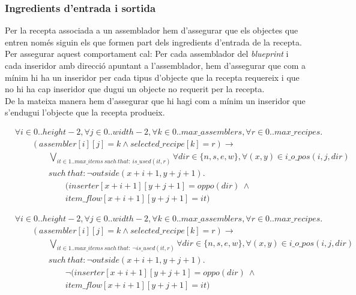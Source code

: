 \subsubsection{Ingredients d'entrada i sortida}
Per la recepta associada a un assemblador hem d'assegurar que els objectes que entren només siguin els que formen part dels ingredients d'entrada de la recepta. Per assegurar aquest comportament cal:
Per cada assemblador del \textit{blueprint} i cada inseridor amb direcció apuntant a l'assemblador, hem d'assegurar que com a mínim hi ha un inseridor per cada tipus d'objecte que la recepta requereix i que no hi ha cap inseridor que dugui un objecte no requerit per la recepta.\\
De la mateixa manera hem d'assegurar que hi hagi com a mínim un inseridor que s'endugui l'objecte que la recepta produeix.

\begin{align*}
    &\forall i \in 0..height-2, \forall j \in 0..width-2, \forall k \in 0..max\_assemblers, \forall r \in 0..max\_recipes.\\
    &\qquad (assembler[i][j]=k \land selected\_recipe[k]=r)\rightarrow\\
    &\qquad \qquad \bigvee_{it \in 1..max\_items \ such \ that: \ is\_used(it, r)} \forall dir\in\{n,s,e,w\},\forall (x,y)\in i\_o\_pos(i,j,dir)\\
    &\qquad \qquad such \ that: \lnot outside(x+i+1, y+j+1).\\
    &\qquad \qquad \qquad (inserter[x+i+1][y+j+1]=oppo(dir) \ \land\\
    &\qquad \qquad \qquad item\_flow[x+i+1][y+j+1]=it)
\end{align*}

\begin{align*}
    &\forall i \in 0..height-2, \forall j \in 0..width-2, \forall k \in 0..max\_assemblers, \forall r \in 0..max\_recipes.\\
    &\qquad(assembler[i][j]=k \land selected\_recipe[k]=r)\rightarrow\\
    &\qquad \qquad \bigvee_{it \in 1..max\_items \ such \ that: \ \lnot is\_used(it, r)} \forall dir\in\{n,s,e,w\},\forall (x,y)\in i\_o\_pos(i,j,dir)\\
    &\qquad \qquad such \ that: \lnot outside(x+i+1, y+j+1).\\
    &\qquad \qquad \qquad \lnot (inserter[x+i+1][y+j+1]=oppo(dir) \ \land\\
    &\qquad \qquad \qquad item\_flow[x+i+1][y+j+1]=it)
\end{align*}


